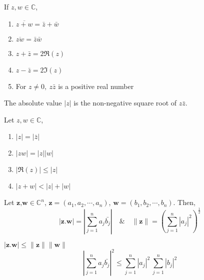 	\begin{theorem} If $z,w \in \mathbb{C}$,
		\begin{enumerate}
			\item $\overline{z+w} = \bar{z} + \bar{w}$
			\item $\overline{zw} = \bar{z} \bar{w}$
			\item $z + \bar{z} = 2\Re{(z)}$
			\item $z - \bar{z} = 2\Im{(z)}$
			\item For $z \ne 0,\ z\bar{z}$ is a positive real number
		\end{enumerate}
	\end{theorem}

	\begin{definition}
		The absolute value $|z|$ is the non-negative square root of $z\bar{z}$.
	\end{definition}

	\begin{theorem} Let $z,w \in \mathbb{C}$,
		\begin{enumerate}
			\item $|z| = |\bar{z}|$
			\item $|zw| = |z||w|$
			\item $|\Re{(z)}| \le |z|$
			\item $|z+w| < |z| + |w|$
		\end{enumerate}
	\end{theorem}

	\begin{definition}
		Let $\textbf{z,w} \in \mathbb{C}^n$, $ \textbf{z} = (a_1, a_2, \cdots, a_n)$, $\textbf{w} = (b_1, b_2, \cdots, b_n)$. Then,
		$$|\textbf{z}.\textbf{w}| = \left|\sum_{j=1}^n a_j \bar{b_j}\right| \quad \& \quad \|\textbf{z}\| = \left(\sum_{j=1}^n |a_j|^2\right)^\frac{1}{2}$$
	\end{definition}

	\begin{theorem}
		$|\textbf{z}.\textbf{w}| \le \|\textbf{z}\| \|\textbf{w}\|$\\
		$$\left|\sum_{j=1}^n a_j\bar{b_j}\right|^2 \le \sum_{j=1}^n |a_j|^2\ \sum_{j=1}^n |b_j|^2$$
	\end{theorem}

